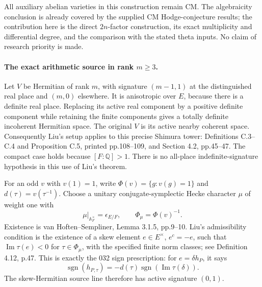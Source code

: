 \documentclass[11pt]{article}
\newcommand{\Q}{\mathbb Q}\newcommand{\C}{\mathbb C}\newcommand{\Z}{\mathbb Z}\newcommand{\R}{\mathbb R}\newcommand{\A}{\mathbb A}\newcommand{\OO}{\mathcal O}
\theoremstyle{definition}\newtheorem{definition}[theorem]{Definition}\newtheorem{remark}[theorem]{Remark}
\begin{document}
All auxiliary abelian varieties in this construction remain CM. The algebraicity
conclusion is already covered by the supplied CM Hodge-conjecture
results; the contribution here is the direct $2n$-factor construction,
its exact multiplicity and differential degree, and the comparison
with the stated theta inputs. No claim of research priority is made.

\paragraph{The exact arithmetic source in rank $m\geq3$.}
Let $V$ be Hermitian of rank $m$, with signature $(m-1,1)$ at the
distinguished real place and $(m,0)$ elsewhere. It is anisotropic
over $E$, because there is a definite real place. Replacing its active
real component by a positive definite component while retaining the
finite components gives a totally definite incoherent Hermitian
space. The original $V$ is its active nearby coherent space.
Consequently Liu's setup applies to this precise Shimura tower:
Definitions C.3--C.4 and Proposition C.5, printed pp.108--109, and
Section 4.2, pp.45--47. The compact case holds because $[F:\Q]>1$.
There is no all-place indefinite-signature hypothesis in this use
of Liu's theorem.

For an odd $v$ with $v(1)=1$, write
$\Phi(v)=\{g:v(g)=1\}$ and $d(\tau)=v(\tau^{-1})$. Choose a
unitary conjugate-symplectic Hecke character $\mu$ of weight one with
\[
 \mu|_{\A_F^\times}=\epsilon_{E/F},\qquad
 \Phi_\mu=\Phi(v)^{-1}.
\]
Existence is van Hoften--Sempliner, Lemma 3.1.5, pp.9--10.
Liu's admissibility condition is the existence of a skew element
$e\in E^\times$, $e^c=-e$, such that
$\operatorname{Im}\tau(e)<0$ for $\tau\in\Phi_\mu$, with the
specified finite norm classes; see Definition 4.12, p.47. This is
exactly the 032 sign prescription: for $e=\delta h_P$, it says
\[
 \operatorname{sgn}(h_{P,\tau})
   =-d(\tau)\operatorname{sgn}(\operatorname{Im}\tau(\delta)).
\]
The skew-Hermitian source line therefore has active signature
$(0,1)$.
\end{document}
